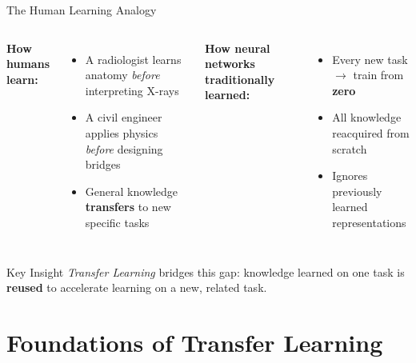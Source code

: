 \documentclass[aspectratio=169,xcolor=dvipsnames]{beamer}
\begin{document}
\begin{frame}{The Human Learning Analogy}
    \begin{columns}
        \textbf{How humans learn:}
        \begin{itemize}
            \item A radiologist learns anatomy \textit{before} interpreting X-rays
            \item A civil engineer applies physics \textit{before} designing bridges
            \item General knowledge \textbf{transfers} to new specific tasks
        \end{itemize}
        \textbf{How neural networks traditionally learned:}
        \begin{itemize}
            \item Every new task $\rightarrow$ train from \textbf{zero}
            \item All knowledge reacquired from scratch
            \item Ignores previously learned representations
        \end{itemize}
    \end{columns}
    \vspace{0.4cm}
    \begin{exampleblock}{Key Insight}
        \textit{Transfer Learning} bridges this gap: knowledge learned on one task is \textbf{reused} to accelerate learning on a new, related task.
    \end{exampleblock}
\end{frame}

\section{Foundations of Transfer Learning}
\end{document}
